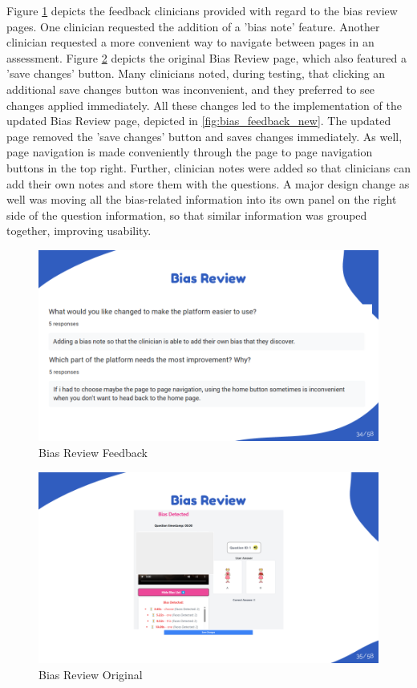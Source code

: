 \documentclass{article}
\begin{document}
Figure \ref{fig:bias_feedback} depicts the feedback clinicians provided with regard to the bias review pages. One clinician requested the addition of a 'bias note' feature. Another clinician requested a more convenient way to navigate between pages in an assessment.
Figure \ref{fig:bias_feedback_original} depicts the original Bias Review page, which also featured a 'save changes' button. Many clinicians noted, during testing, that clicking an additional save changes button was inconvenient, and they
preferred to see changes applied immediately. All these changes led to the implementation of the updated Bias Review page, depicted in \ref{fig:bias_feedback_new}.
The updated page removed the 'save changes' button and saves changes immediately. As well, page navigation is made conveniently through the page to page navigation buttons in the top right.
Further, clinician notes were added so that clinicians can add their own notes and store them with the questions.
A major design change as well was moving all the bias-related information into its own panel on the right side of the question information, so that similar information was grouped together, improving usability.

\begin{figure}[H]
  \centering
  \includegraphics[width=\textwidth]{images/slide34.png}
  \caption{Bias Review Feedback}
  \label{fig:bias_feedback}
\end{figure}

\begin{figure}[H]
  \centering
  \includegraphics[width=\textwidth]{images/slide35.png}
  \caption{Bias Review Original}
  \label{fig:bias_feedback_original}
\end{figure}
\end{document}
